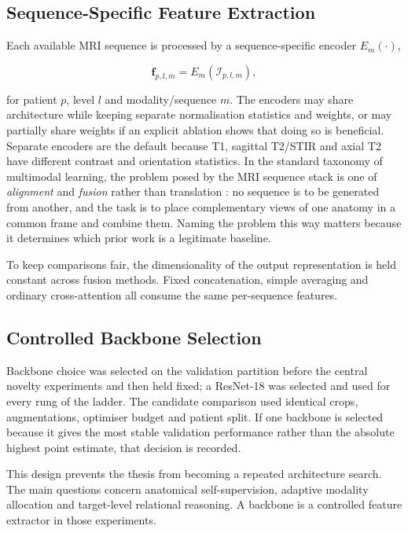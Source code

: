 \subsection{Sequence-Specific Feature Extraction}
\label{sec:method-sequence-encoders}

Each available MRI sequence is processed by a sequence-specific encoder
$E_m(\cdot)$,

\begin{equation}
\mathbf{f}_{p,l,m}=E_m(\mathcal{I}_{p,l,m}),
\label{eq:sequence-encoder}
\end{equation}

for patient $p$, level $l$ and modality/sequence $m$. The encoders may share
architecture while keeping separate normalisation statistics and weights, or
may partially share weights if an explicit ablation shows that doing so is
beneficial. Separate encoders are the default because T1, sagittal T2/STIR and
axial T2 have different contrast and orientation statistics. In the standard
taxonomy of multimodal learning, the problem posed by the MRI sequence stack is
one of \emph{alignment} and \emph{fusion} rather than translation
\cite{baltrusaitis2019multimodal}: no sequence is to be generated from another,
and the task is to place complementary views of one anatomy in a common frame
and combine them. Naming the problem this way matters because it determines
which prior work is a legitimate baseline.

To keep comparisons fair, the dimensionality of the output representation is
held constant across fusion methods. Fixed concatenation, simple averaging and
ordinary cross-attention all consume the same per-sequence features.

\subsection{Controlled Backbone Selection}
\label{sec:method-backbone-control}

Backbone choice was selected on the validation partition before the central
novelty experiments and then held fixed; a ResNet-18 was selected and used for
every rung of the ladder. The candidate comparison used identical crops,
augmentations, optimiser budget and patient split. If one
backbone is selected because it gives the most stable validation performance
rather than the absolute highest point estimate, that decision is recorded.

This design prevents the thesis from becoming a repeated architecture search.
The main questions concern anatomical self-supervision, adaptive modality
allocation and target-level relational reasoning. A backbone is a controlled
feature extractor in those experiments.


